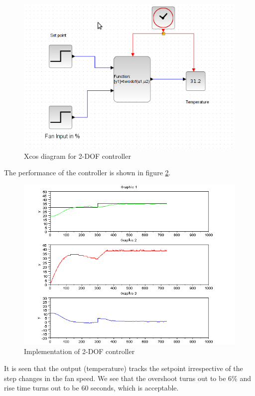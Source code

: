 \begin{figure}
\centering
\includegraphics[width=\linewidth]{2-DOF_manual/2dof-xcos}
\caption{Xcos diagram for 2-DOF controller}
\label{2dof-xcos}
\end{figure}
The performance of the controller is shown in figure \ref{rt_127}. 
\begin{figure}
\centering
\includegraphics[width=\linewidth]{2-DOF_manual/2dof_resp.png}
\caption{Implementation of 2-DOF controller}
\label{rt_127}
\end{figure}
It is seen that the output (temperature) tracks the setpoint irrespective of the step changes in the fan speed.
We see that the overshoot turns out to be 6\% and rise time turns out to be 60 seconds, which is acceptable.



